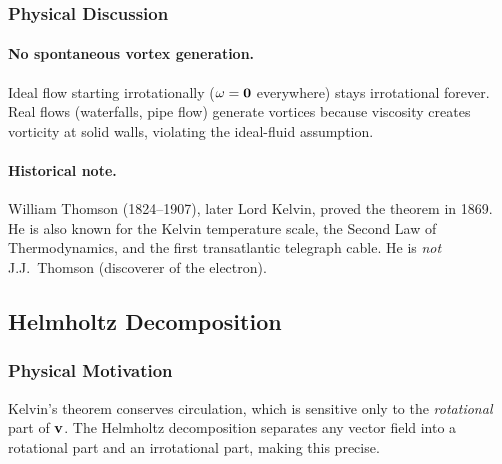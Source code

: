 \documentclass[../main.tex]{subfiles}
\begin{document}
\subsubsection{Physical Discussion}

\paragraph{No spontaneous vortex generation.}
Ideal flow starting irrotationally ($\mathbf{\omega}=\mathbf{0}$ everywhere) stays irrotational forever. Real flows (waterfalls, pipe flow) generate vortices because viscosity creates vorticity at solid walls, violating the ideal-fluid assumption.

\paragraph{Historical note.}
William Thomson (1824–1907), later Lord Kelvin, proved the theorem in 1869. He is also known for the Kelvin temperature scale, the Second Law of Thermodynamics, and the first transatlantic telegraph cable. He is \emph{not} J.J.\ Thomson (discoverer of the electron).

\subsection{Helmholtz Decomposition}\label{sec:lec14:helmholtz}

\subsubsection*{Physical Motivation}
Kelvin's theorem conserves circulation, which is sensitive only to the \emph{rotational} part of $\mathbf{v}$. The Helmholtz decomposition separates any vector field into a rotational part and an irrotational part, making this precise.

\end{document}

